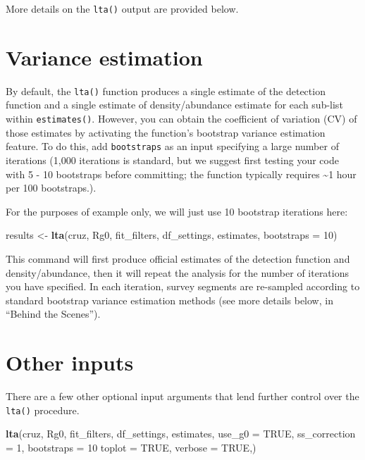 \documentclass[
]{book}
\newenvironment{Shaded}{\begin{snugshade}}{\end{snugshade}}
\newcommand{\DataTypeTok}[1]{\textcolor[rgb]{0.13,0.29,0.53}{#1}}
\newcommand{\DecValTok}[1]{\textcolor[rgb]{0.00,0.00,0.81}{#1}}
\newcommand{\KeywordTok}[1]{\textcolor[rgb]{0.13,0.29,0.53}{\textbf{#1}}}
\newcommand{\NormalTok}[1]{#1}
\newcommand{\OtherTok}[1]{\textcolor[rgb]{0.56,0.35,0.01}{#1}}
\newcommand{\StringTok}[1]{\textcolor[rgb]{0.31,0.60,0.02}{#1}}
\begin{document}
More details on the \texttt{lta()} output are provided below.

\hypertarget{variance-estimation}{%
\section*{Variance estimation}\label{variance-estimation}}

By default, the \texttt{lta()} function produces a single estimate of the detection function and a single estimate of density/abundance estimate for each sub-list within \texttt{estimates()}. However, you can obtain the coefficient of variation (CV) of those estimates by activating the function's bootstrap variance estimation feature. To do this, add \texttt{bootstraps} as an input specifying a large number of iterations (1,000 iterations is standard, but we suggest first testing your code with 5 - 10 bootstraps before committing; the function typically requires \textasciitilde1 hour per 100 bootstraps.).

For the purposes of example only, we will just use 10 bootstrap iterations here:

\begin{Shaded}
\begin{Highlighting}[]
\NormalTok{results <-}\StringTok{ }\KeywordTok{lta}\NormalTok{(cruz, Rg0,}
\NormalTok{               fit_filters, df_settings, estimates,}
               \DataTypeTok{bootstraps =} \DecValTok{10}\NormalTok{)}
\end{Highlighting}
\end{Shaded}

This command will first produce official estimates of the detection function and density/abundance, then it will repeat the analysis for the number of iterations you have specified. In each iteration, survey segments are re-sampled according to standard bootstrap variance estimation methods (see more details below, in ``Behind the Scenes'').

\hypertarget{other-inputs}{%
\section*{Other inputs}\label{other-inputs}}

There are a few other optional input arguments that lend further control over the \texttt{lta()} procedure.

\begin{Shaded}
\begin{Highlighting}[]
\KeywordTok{lta}\NormalTok{(cruz,}
\NormalTok{    Rg0,}
\NormalTok{    fit_filters,}
\NormalTok{    df_settings,}
\NormalTok{    estimates,}
    \DataTypeTok{use_g0 =} \OtherTok{TRUE}\NormalTok{,}
    \DataTypeTok{ss_correction =} \DecValTok{1}\NormalTok{,}
    \DataTypeTok{bootstraps =} \DecValTok{10}
    \DataTypeTok{toplot =} \OtherTok{TRUE}\NormalTok{,}
    \DataTypeTok{verbose =} \OtherTok{TRUE}\NormalTok{,)}
\end{Highlighting}
\end{Shaded}
\end{document}
